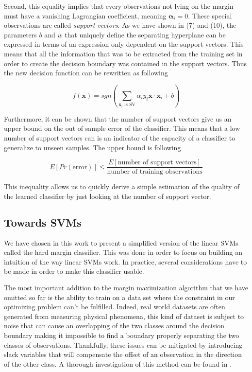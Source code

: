 Second, this equality implies that every observations not lying on the margin must have a vanishing Lagrangian coefficient, meaning $\boldsymbol{\alpha}_i = 0$. These special observations are called \textit{support vectors}. As we have shown in (7) and (10), the parameters $b$ and $w$ that uniquely define the separating hyperplane can be expressed in terms of an expression only dependent on the support vectors. This means that all the information that was to be extracted from the training set in order to create the decision boundary was contained in the support vectors. Thus the new decision function can be rewritten as following

\begin{equation}
  f(\mathbf{x}) = sgn\left(\sum_{\mathbf{x}_i \text{ is SV}}\alpha_iy_i\mathbf{x} \cdot \mathbf{x}_i + b\right)
\end{equation}

Furthermore, it can be shown that the number of support vectors give us an upper bound on the out of sample error of the classifier. This means that a low number of support vectors can is an indicator of the capacity of a classifier to generalize to unseen samples. The upper bound is following \cite{Vapnik:1995:NSL:211359}

\begin{equation}
  E\left[Pr\left(\text{error}\right)\right] \leq \frac{E\left[\text{number of support vectors}\right]}{\text{number of training observations}}
\end{equation}

This inequality allows us to quickly derive a simple estimation of the quality of the learned classifier by just looking at the number of support vector.

\subsection{Towards SVMs}

We have chosen in this work to present a simplified version of the linear SVMs called the hard margin classifier. This was done in order to focus on building an intuition of the way linear SVMs work. In practice, several considerations have to be made in order to make this classifier usable.

The most important addition to the margin maximization algorithm that we have omitted so far is the ability to train on a data set where the constraint in our optimizing problem can't be fulfilled. Indeed, real world datasets are often generated from measuring physical phenomena, this kind of dataset is subject to noise that can cause an overlapping of the two classes around the decision boundary making it impossible to find a boundary properly separating the two classes of observations. Thankfully, these issues can be mitigated by introducing slack variables that will compensate the offset of an observation in the direction of the other class. A thorough investigation of this method can be found in \cite{Schoelkopf95extractingsupport}.

